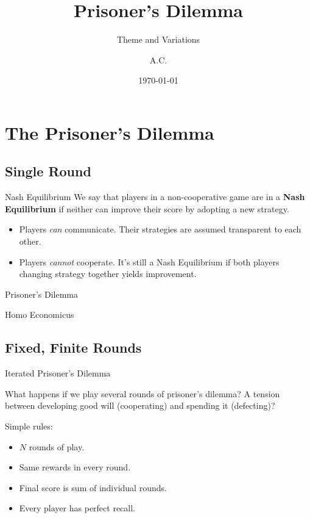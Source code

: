 \documentclass[pdf]{beamer}
\title{Prisoner's Dilemma}
\subtitle{Theme and Variations}
\author{A.C.}
\date{\today}
\begin{document}
\begin{frame}
  \titlepage
\end{frame}

\section{The Prisoner's Dilemma}
\subsection{Single Round}
\begin{frame}{Nash Equilibrium}
  We say that players in a non-cooperative game are in a \textbf{Nash Equilibrium}
  if neither can improve their score by adopting a new strategy.
  \begin{itemize}
  \pause\item Players \emph{can} communicate. Their strategies are assumed transparent
    to each other.
  \pause\item Players \emph{cannot} cooperate. It's still a Nash Equilibrium if both
    players changing strategy together yields improvement.
  \end{itemize}
\end{frame}

\begin{frame}{Prisoner's Dilemma}

\end{frame}

\begin{frame}{Homo Economicus}
\end{frame}

\subsection{Fixed, Finite Rounds}

\begin{frame}{Iterated Prisoner's Dilemma}

  What happens if we play several rounds of prisoner's dilemma? A tension
  between developing good will (cooperating) and spending it (defecting)?

  Simple rules:
  \begin{itemize}
  \item $N$ rounds of play.
  \item Same rewards in every round.
  \item Final score is sum of individual rounds.
  \item Every player has perfect recall.
  \end{itemize}
\end{frame}
\end{document}
